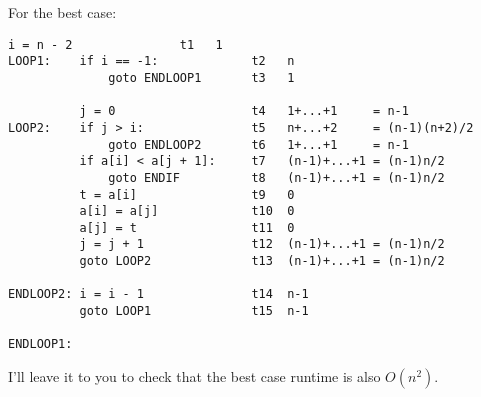 For the best case:
{\footnotesize
\begin{Verbatim}[frame=single, fontsize=\footnotesize]
          i = n - 2               t1   1
LOOP1:    if i == -1:             t2   n
              goto ENDLOOP1       t3   1

          j = 0                   t4   1+...+1     = n-1
LOOP2:    if j > i:               t5   n+...+2     = (n-1)(n+2)/2
              goto ENDLOOP2       t6   1+...+1     = n-1
          if a[i] < a[j + 1]:     t7   (n-1)+...+1 = (n-1)n/2
              goto ENDIF          t8   (n-1)+...+1 = (n-1)n/2
          t = a[i]                t9   0
          a[i] = a[j]             t10  0
          a[j] = t                t11  0
          j = j + 1               t12  (n-1)+...+1 = (n-1)n/2
          goto LOOP2              t13  (n-1)+...+1 = (n-1)n/2
                                  
ENDLOOP2: i = i - 1               t14  n-1
          goto LOOP1              t15  n-1

ENDLOOP1:
\end{Verbatim}
}
I'll leave it to you to check that the best case runtime is also 
$O(n^2)$.


\newpage
\newpage
\newpage
\newpage
\newpage
\newpage
\newpage
\newpage
\newpage
\newpage
\newpage
\newpage

